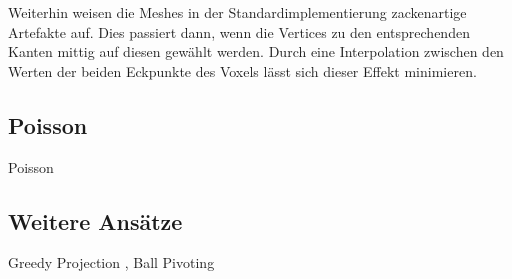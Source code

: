 Weiterhin weisen die Meshes in der Standardimplementierung zackenartige Artefakte auf.
Dies passiert dann, wenn die Vertices zu den entsprechenden Kanten mittig auf diesen gewählt werden.
Durch eine Interpolation zwischen den Werten der beiden Eckpunkte des Voxels lässt sich dieser Effekt minimieren.


\subsection{Poisson}
\label{subsec:poisson}

Poisson \cite{kazhdan2006poisson}


\subsection{Weitere Ansätze}
\label{subsec:triangulation-others}
Greedy Projection \cite{Marton09ICRA},
Ball Pivoting \cite{bernardini1999ball}
